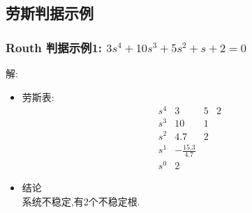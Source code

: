 \documentclass{article}
\begin{document}
\subsection{劳斯判据示例}
\label{sec-2-3}
\begin{frame}
\frametitle{Routh 判据示例1: $3s^{4}+10s^{3}+5s^{2}+s+2=0$}
\label{sec-2-3-1}


解:
\begin{itemize}

\item 劳斯表:
\label{sec-2-3-1-1}%
\begin{equation*}
\begin{matrix}
s^{4} & 3   &  5  &  2 \\
s^{3} & 10  &  1        \\
s^{2} & 4.7 &  2       \\
s^{1} & -\frac{15.3}{4.7}  \\
s^{0} & 2   
\end{matrix}
\end{equation*}


\item 结论\\
\label{sec-2-3-1-2}%
系统不稳定,有2个不稳定根.

\end{itemize} %
\end{frame}
\end{document}
